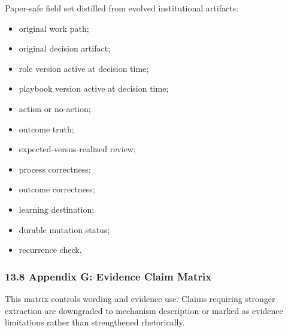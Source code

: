 \documentclass[
]{article}
\providecommand{\tightlist}{%
  \setlength{\itemsep}{0pt}\setlength{\parskip}{0pt}}
\begin{document}
Paper-safe field set distilled from evolved institutional artifacts:

\begin{itemize}
\tightlist
\item
  original work path;
\item
  original decision artifact;
\item
  role version active at decision time;
\item
  playbook version active at decision time;
\item
  action or no-action;
\item
  outcome truth;
\item
  expected-versus-realized review;
\item
  process correctness;
\item
  outcome correctness;
\item
  learning destination;
\item
  durable mutation status;
\item
  recurrence check.
\end{itemize}

\subsubsection{13.8 Appendix G: Evidence Claim Matrix}\label{appendix-g-evidence-claim-matrix}

This matrix controls wording and evidence use. Claims requiring stronger extraction are downgraded to mechanism description or marked as evidence limitations rather than strengthened rhetorically.
\end{document}

